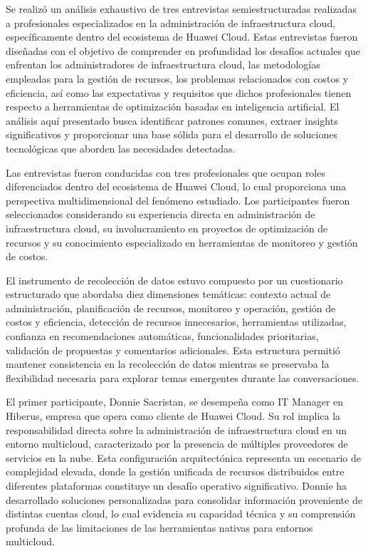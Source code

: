 Se realizó un análisis exhaustivo de tres entrevistas semiestructuradas realizadas a profesionales especializados en la administración de infraestructura cloud, específicamente dentro del ecosistema de Huawei Cloud. Estas entrevistas fueron diseñadas con el objetivo de comprender en profundidad los desafíos actuales que enfrentan los administradores de infraestructura cloud, las metodologías empleadas para la gestión de recursos, los problemas relacionados con costos y eficiencia, así como las expectativas y requisitos que dichos profesionales tienen respecto a herramientas de optimización basadas en inteligencia artificial. El análisis aquí presentado busca identificar patrones comunes, extraer insights significativos y proporcionar una base sólida para el desarrollo de soluciones tecnológicas que aborden las necesidades detectadas.

Las entrevistas fueron conducidas con tres profesionales que ocupan roles diferenciados dentro del ecosistema de Huawei Cloud, lo cual proporciona una perspectiva multidimensional del fenómeno estudiado. Los participantes fueron seleccionados considerando su experiencia directa en administración de infraestructura cloud, su involucramiento en proyectos de optimización de recursos y su conocimiento especializado en herramientas de monitoreo y gestión de costos.

El instrumento de recolección de datos estuvo compuesto por un cuestionario estructurado que abordaba diez dimensiones temáticas: contexto actual de administración, planificación de recursos, monitoreo y operación, gestión de costos y eficiencia, detección de recursos innecesarios, herramientas utilizadas, confianza en recomendaciones automáticas, funcionalidades prioritarias, validación de propuestas y comentarios adicionales. Esta estructura permitió mantener consistencia en la recolección de datos mientras se preservaba la flexibilidad necesaria para explorar temas emergentes durante las conversaciones.

El primer participante, Donnie Sacristan, se desempeña como IT Manager en Hiberus, empresa que opera como cliente de Huawei Cloud. Su rol implica la responsabilidad directa sobre la administración de infraestructura cloud en un entorno multicloud, caracterizado por la presencia de múltiples proveedores de servicios en la nube. Esta configuración arquitectónica representa un escenario de complejidad elevada, donde la gestión unificada de recursos distribuidos entre diferentes plataformas constituye un desafío operativo significativo. Donnie ha desarrollado soluciones personalizadas para consolidar información proveniente de distintas cuentas cloud, lo cual evidencia su capacidad técnica y su comprensión profunda de las limitaciones de las herramientas nativas para entornos multicloud.

